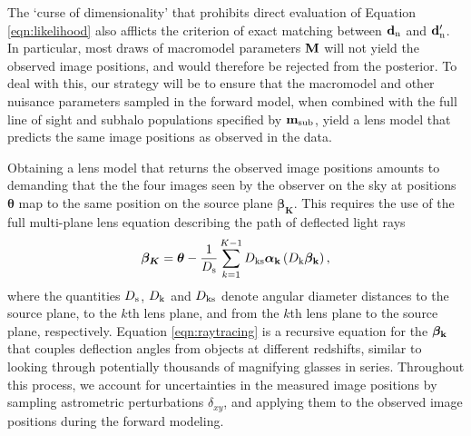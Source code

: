 The `curse of dimensionality' that prohibits direct evaluation of Equation \ref{eqn:likelihood} also afflicts the criterion of exact matching between ${\bf{d}_{\rm{n}}}$ and ${\bf{d}_{\rm{n}}^{\prime}}$. In particular, most draws of macromodel parameters ${\bf{M}}$ will not yield the observed image positions, and would therefore be rejected from the posterior. To deal with this, our strategy will be to ensure that the macromodel and other nuisance parameters sampled in the forward model, when combined with the full line of sight and subhalo populations specified by ${\bf{m}_{\rm{sub}}}$, yield a lens model that predicts the same image positions as observed in the data. 

Obtaining a lens model that returns the observed image positions amounts to demanding that the the four images seen by the observer on the sky at positions $\boldsymbol{\theta}$ map to the same position on the source plane $\boldsymbol{\beta_K}$. This requires the use of the full multi-plane lens equation describing the path of deflected light rays \citep[e.g.][]{Schnedier1997}
\begin{equation}
\label{eqn:raytracing}
\boldsymbol{\beta_K} = \boldsymbol{\theta} - \frac{1}{D_{\rm{s}}} \sum_{k=1}^{K-1} D_{\rm{ks}}{\boldsymbol{\alpha_{\rm{k}}}} \left(D_{\rm{k}} \boldsymbol{\beta_{\rm{k}}}\right),
\end{equation} 
where the quantities $D_{\rm{s}}$, $D_{\rm{k}}$ and $D_{\rm{ks}}$ denote angular diameter distances to the source plane, to the $k$th lens plane, and from the $k$th lens plane to the source plane, respectively. Equation \ref{eqn:raytracing} is a recursive equation for the $\boldsymbol{\beta_{\rm{k}}}$ that couples deflection angles from objects at different redshifts, similar to looking through potentially thousands of magnifying glasses in series. Throughout this process, we account for uncertainties in the measured image positions by sampling astrometric perturbations $\delta_{xy}$, and applying them to the observed image positions during the forward modeling.


